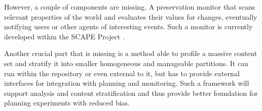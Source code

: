 However, a couple of components are missing. A preservation monitor that scans relevant properties of the world and evaluates their values for changes, eventually notifying users or other agents of interesting events. Such a monitor is currently developed within the SCAPE Project \cite{becker-ipres2012, duretec:2012:watch}.

Another crucial part that is missing is a method able to profile a massive content set and stratify it into smaller homogeneous and manageable partitions. It can run within the repository or even external to it, but has to provide external interfaces for integration with planning and monitoring. Such a framework will support analysis and content stratification and thus provide better foundation for planning experiments with reduced bias.